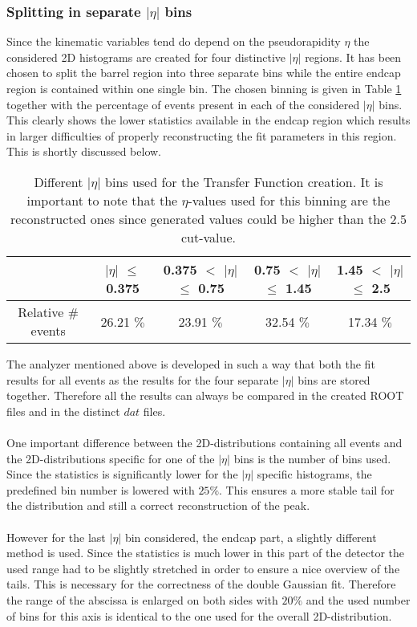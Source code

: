 \subsubsection{Splitting in separate $\vert \eta \vert$ bins}
Since the kinematic variables tend do depend on the pseudorapidity $\eta$ the considered 2D histograms are created for four distinctive $\vert \eta \vert$ regions. It has been chosen to split the barrel region into three separate bins while the entire endcap region is contained within one single bin. The chosen binning is given in Table \ref{table::EtaBins} together with the percentage of events present in each of the considered $\vert \eta \vert$ bins. This clearly shows the lower statistics available in the endcap region which results in larger difficulties of properly reconstructing the fit parameters in this region. This is shortly discussed below.
\begin{table}[h!]
 \centering
 \begin{tabular}{|c|c|c|c|c|}
  \hline
			 & $\vert\eta\vert$ $\leq$ 0.375	& 0.375 $<$ $\vert\eta\vert$ $\leq$ 0.75	& 0.75 $<$ $\vert\eta\vert$ $\leq$ 1.45	& 1.45 $<$ $\vert\eta\vert$ $\leq$ 2.5	\\
  \hline
    Relative $\#$ events &  26.21 $\%$				& 23.91 $\%$					&	32.54 $\%$			& 	17.34 $\%$			\\
  \hline
 \end{tabular} 
 \caption{Different $\vert\eta\vert$ bins used for the Transfer Function creation. It is important to note that the $\eta$-values used for this binning are the reconstructed ones since generated values could be higher than the $2.5$ cut-value.} \label{table::EtaBins}
\end{table}

The analyzer mentioned above is developed in such a way that both the fit results for all events as the results for the four separate $\vert \eta \vert$ bins are stored together. Therefore all the results can always be compared in the created ROOT files and in the distinct $dat$ files.\\
\\
One important difference between the 2D-distributions containing all events and the 2D-distributions specific for one of the $\vert \eta \vert$ bins is the number of bins used. Since the statistics is significantly lower for the $\vert \eta \vert$ specific histograms, the predefined bin number is lowered with $25 \%$. This ensures a more stable tail for the distribution and still a correct reconstruction of the peak.\\
\\
However for the last $\vert \eta \vert$ bin considered, the endcap part, a slightly different method is used. Since the statistics is much lower in this part of the detector the used range had to be slightly stretched in order to ensure a nice overview of the tails. This is necessary for the correctness of the double Gaussian fit. Therefore the range of the abscissa is enlarged on both sides with $20 \%$ and the used number of bins for this axis is identical to the one used for the overall 2D-distribution.

